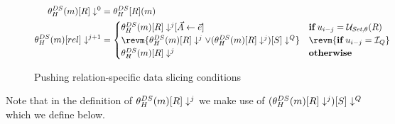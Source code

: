 \begin{figure*}[t]
  \centering
\begin{align}
  \label{eq:pushing-queries-multi-rel}
  \mpushCond{\condDSh{\modi}}{0}{\rel}                                                 & = \mcondDSh{\modi}{\rel}                            \\
  \mpushCond{\condDSh{\modi}}{j+1}{rel}                                               & =
                                                                                        \begin{cases}
                                                                                          \subst{\mpushCond{\condDSh{\modi}}{j}{\rel}}{\vec{A}}{\vec{e}} & \mathbf{if}\, \up_{i-j} = \update{\pset}{\cond}(\rel) \\
                                                                                          \revm{\mpushCond{\condDSh{\modi}}{j}{\rel} \lor \mqpushCond{\mpushCond{\condDSh{\modi}}{j}{\rel}}{\query}{S}} &\revm{\mathbf{if}\, \up_{i-j} = \aqinsert}\\
                                                                                          \mpushCond{\condDSh{\modi}}{j}{\rel}             & \mathbf{otherwise}                           \\
                                                                                        \end{cases}
\end{align}
  \caption{Pushing relation-specific data slicing conditions}\label{fig:pushing-relation-specific}
\end{figure*}

Note that in the definition of ${\theta_{H}^{DS}(m)}[R]\downarrow^{j}$ we make use of $({\theta_{H}^{DS}(m)}[R]\downarrow^{j})[S]\downarrow^{Q}$ which we define below. %

